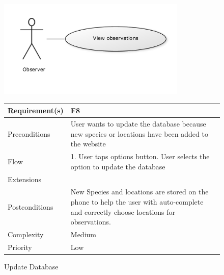 \begin{figure}
		\centering
		\includegraphics[width=0.8\textwidth]{reqspec/uc/viewobs.png}
		\caption{Update Database}
		\label{fig:updateobs}
\begin{tabular}[t]{|l|p{}|}\hline
	Requirement(s)&F8\\\hline
	Preconditions&User wants to update the database because new species or
	locations have been added to the website\\\hline
	Flow&1. User taps options button\newline
	2. User selects the option to update the database\\\hline
	Extensions& \\\hline
	Postconditions&New Species and locations are stored on the phone to help
	the user with auto-complete and correctly choose locations for observations.\\\hline
	Complexity&Medium\\\hline
	Priority&Low\\\hline
\end{tabular}
\end{figure}
